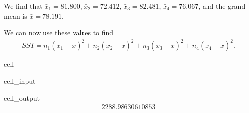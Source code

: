 \documentclass[letterpaper,10pt,english]{jupyterBook}
\begin{document}
\sphinxAtStartPar
We find that \(\bar{x}_1 = 81.800\), \(\bar{x}_2 = 72.412\), \(\bar{x}_3 = 82.481\), \(\bar{x}_4 = 76.067\), and the grand mean is \( \bar{\bar{x}} = 78.191\).

\sphinxAtStartPar
We can now use these values to find
\begin{equation*}
\begin{split}SST = n_1(\bar{x}_1 - \bar{\bar{x}})^2 + n_2(\bar{x}_2 - \bar{\bar{x}})^2 + n_3(\bar{x}_3 - \bar{\bar{x}})^2 + n_4(\bar{x}_4 - \bar{\bar{x}})^2.\end{split}
\end{equation*}
\begin{sphinxuseclass}{cell}\begin{sphinxVerbatimInput}

\begin{sphinxuseclass}{cell_input}
\begin{sphinxVerbatim}[commandchars=\\\{\}]
\end{sphinxVerbatim}

\end{sphinxuseclass}\end{sphinxVerbatimInput}
\begin{sphinxVerbatimOutput}

\begin{sphinxuseclass}{cell_output}\begin{equation*}
\begin{split}2288.98630610853\end{split}
\end{equation*}
\end{sphinxuseclass}\end{sphinxVerbatimOutput}

\end{sphinxuseclass}
\end{document}
